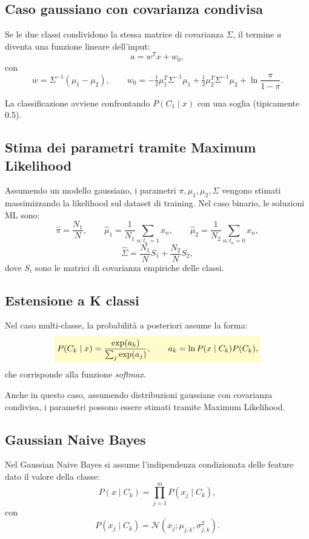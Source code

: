 \documentclass[a4paper,12pt]{report}
\newcommand{\highlight}[1]{%
\colorbox{yellow!20}{$\displaystyle #1$}%
}
\begin{document}
\subsection{Caso gaussiano con covarianza condivisa}

Se le due classi condividono la stessa matrice di covarianza \( \Sigma \), il termine \( a \) diventa una funzione lineare dell’input:
\[
a = w^T x + w_0,
\]
con
\[
w = \Sigma^{-1}(\mu_1 - \mu_2),
\qquad
w_0 = -\tfrac{1}{2}\mu_1^T \Sigma^{-1}\mu_1
       +\tfrac{1}{2}\mu_2^T \Sigma^{-1}\mu_2
       +\ln \frac{\pi}{1-\pi}.
\]

La classificazione avviene confrontando \( P(C_1 \mid x) \) con una soglia (tipicamente 0.5).

\subsection{Stima dei parametri tramite Maximum Likelihood}

Assumendo un modello gaussiano, i parametri \( \pi, \mu_1, \mu_2, \Sigma \) vengono stimati massimizzando la likelihood sul dataset di training.
Nel caso binario, le soluzioni ML sono:
\[
\hat{\pi} = \frac{N_1}{N}, \qquad
\hat{\mu}_1 = \frac{1}{N_1}\sum_{n:t_n=1} x_n, \qquad
\hat{\mu}_2 = \frac{1}{N_2}\sum_{n:t_n=0} x_n,
\]
\[
\hat{\Sigma} = \frac{N_1}{N}S_1 + \frac{N_2}{N}S_2,
\]
dove \( S_i \) sono le matrici di covarianza empiriche delle classi.

\subsection{Estensione a K classi}

Nel caso multi-classe, la probabilità a posteriori assume la forma:
\[
\highlight{
P(C_k \mid x) =
\frac{\exp(a_k)}{\sum_j \exp(a_j)},
\qquad
a_k = \ln P(x \mid C_k)P(C_k),}
\]
che corrisponde alla funzione \textit{softmax}.

Anche in questo caso, assumendo distribuzioni gaussiane con covarianza condivisa, i parametri possono essere stimati tramite Maximum Likelihood.

\subsection{Gaussian Naive Bayes}

Nel Gaussian Naive Bayes si assume l’indipendenza condizionata delle feature dato il valore della classe:
\[
P(x \mid C_k) = \prod_{j=1}^m P(x_j \mid C_k),
\]
con
\[
P(x_j \mid C_k) = \mathcal{N}(x_j; \mu_{j,k}, \sigma_{j,k}^2).
\]
\end{document}
